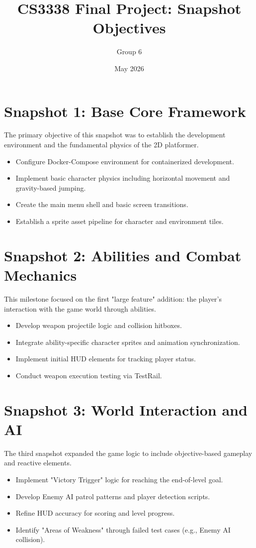 \documentclass{article}
\title{CS3338 Final Project: Snapshot Objectives}
\author{Group 6}
\date{May 2026}
\begin{document}
\maketitle

\section{Snapshot 1: Base Core Framework}
The primary objective of this snapshot was to establish the development environment and the fundamental physics of the 2D platformer.
\begin{itemize}
    \item Configure Docker-Compose environment for containerized development.
    \item Implement basic character physics including horizontal movement and gravity-based jumping.
    \item Create the main menu shell and basic screen transitions.
    \item Establish a sprite asset pipeline for character and environment tiles.
\end{itemize}

\section{Snapshot 2: Abilities and Combat Mechanics}
This milestone focused on the first "large feature" addition: the player's interaction with the game world through abilities.
\begin{itemize}
    \item Develop weapon projectile logic and collision hitboxes.
    \item Integrate ability-specific character sprites and animation synchronization.
    \item Implement initial HUD elements for tracking player status.
    \item Conduct weapon execution testing via TestRail.
\end{itemize}

\section{Snapshot 3: World Interaction and AI}
The third snapshot expanded the game logic to include objective-based gameplay and reactive elements.
\begin{itemize}
    \item Implement "Victory Trigger" logic for reaching the end-of-level goal.
    \item Develop Enemy AI patrol patterns and player detection scripts.
    \item Refine HUD accuracy for scoring and level progress.
    \item Identify "Areas of Weakness" through failed test cases (e.g., Enemy AI collision).
\end{itemize}
\end{document}
